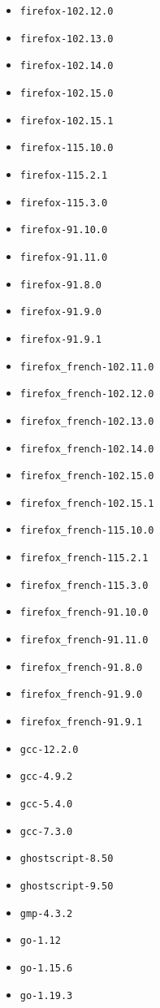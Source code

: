 \begin{multicols}{3}
\begin{itemize}
\item \verb|firefox-102.12.0|
\item \verb|firefox-102.13.0|
\item \verb|firefox-102.14.0|
\item \verb|firefox-102.15.0|
\item \verb|firefox-102.15.1|
\item \verb|firefox-115.10.0|
\item \verb|firefox-115.2.1|
\item \verb|firefox-115.3.0|
\item \verb|firefox-91.10.0|
\item \verb|firefox-91.11.0|
\item \verb|firefox-91.8.0|
\item \verb|firefox-91.9.0|
\item \verb|firefox-91.9.1|
\item \verb|firefox_french-102.11.0|
\item \verb|firefox_french-102.12.0|
\item \verb|firefox_french-102.13.0|
\item \verb|firefox_french-102.14.0|
\item \verb|firefox_french-102.15.0|
\item \verb|firefox_french-102.15.1|
\item \verb|firefox_french-115.10.0|
\item \verb|firefox_french-115.2.1|
\item \verb|firefox_french-115.3.0|
\item \verb|firefox_french-91.10.0|
\item \verb|firefox_french-91.11.0|
\item \verb|firefox_french-91.8.0|
\item \verb|firefox_french-91.9.0|
\item \verb|firefox_french-91.9.1|
\item \verb|gcc-12.2.0|
\item \verb|gcc-4.9.2|
\item \verb|gcc-5.4.0|
\item \verb|gcc-7.3.0|
\item \verb|ghostscript-8.50|
\item \verb|ghostscript-9.50|
\item \verb|gmp-4.3.2|
\item \verb|go-1.12|
\item \verb|go-1.15.6|
\item \verb|go-1.19.3|

\end{itemize}
\end{multicols}
